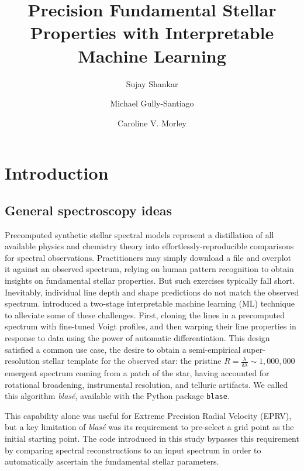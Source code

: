 \documentclass[twocolumn]{aastex631}
\begin{document}
\title{Precision Fundamental Stellar Properties with Interpretable Machine Learning}
    
\author[0000-0002-2290-6810]{Sujay Shankar}
\author[0000-0002-4020-3457]{Michael Gully-Santiago}
\author[0000-0002-4404-0456]{Caroline V. Morley}

\begin{abstract}
    \blindtext
\end{abstract}

\keywords{}


\section{Introduction}



\subsection{General spectroscopy ideas}

Precomputed synthetic stellar spectral models represent a distillation of all available physics
and chemistry theory into effortlessly-reproducible comparisons for spectral observations.
Practitioners may simply download a file and overplot it against an observed spectrum, relying on
human pattern recognition to obtain insights on fundamental stellar properties. But such exercises
typically fall short. Inevitably, individual line depth and shape predictions do not match the
observed spectrum. \citet{2022ApJ...941..200G} introduced a two-stage interpretable machine learning (ML)
technique to alleviate some of these challenges. First, cloning the lines in a precomputed spectrum
with fine-tuned Voigt profiles, and then warping their line properties in response to data using
the power of automatic differentiation. This design satisfied a common use case, the desire to
obtain a semi-empirical super-resolution stellar template for the observed star: the pristine
$R=\frac{\lambda}{\delta \lambda}\sim1,000,000$ emergent spectrum coming from a patch of the star,
having accounted for rotational broadening, instrumental resolution, and telluric artifacts.
We called this algorithm \emph{blas\'e}, available with the Python package \texttt{blase}.

This capability alone was useful for Extreme Precision Radial Velocity (EPRV), but a key limitation
of \emph{blas\'e} was its requirement to pre-select a grid point as the initial starting point. The code
introduced in this study bypasses this requirement by comparing spectral reconstructions to an input
spectrum in order to automatically ascertain the fundamental stellar parameters.
\end{document}
